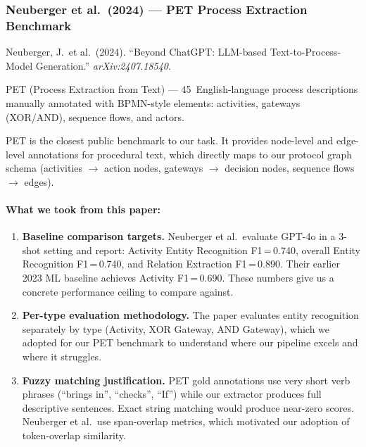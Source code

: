 \documentclass[12pt,a4paper]{article}
\begin{document}
\subsubsection{Neuberger et al.\ (2024) --- PET Process Extraction Benchmark}
\label{sec:neuberger}

\begin{description}[leftmargin=2em]
    \item[Paper:] Neuberger, J.\ et al.\ (2024). ``Beyond ChatGPT: LLM-based Text-to-Process-Model Generation.'' \textit{arXiv:2407.18540}.
    \item[Dataset:] PET (Process Extraction from Text) --- 45~English-language process descriptions manually annotated with BPMN-style elements: activities, gateways (XOR/AND), sequence flows, and actors.
    \item[Relevance:] PET is the closest public benchmark to our task. It provides node-level and edge-level annotations for procedural text, which directly maps to our protocol graph schema (activities $\rightarrow$ action nodes, gateways $\rightarrow$ decision nodes, sequence flows $\rightarrow$ edges).
\end{description}

\paragraph{What we took from this paper:}
\begin{enumerate}[leftmargin=2em]
    \item \textbf{Baseline comparison targets.} Neuberger et al.\ evaluate GPT-4o in a 3-shot setting and report: Activity Entity Recognition F1\,=\,0.740, overall Entity Recognition F1\,=\,0.740, and Relation Extraction F1\,=\,0.890. Their earlier 2023 ML baseline achieves Activity F1\,=\,0.690. These numbers give us a concrete performance ceiling to compare against.
    \item \textbf{Per-type evaluation methodology.} The paper evaluates entity recognition separately by type (Activity, XOR Gateway, AND Gateway), which we adopted for our PET benchmark to understand where our pipeline excels and where it struggles.
    \item \textbf{Fuzzy matching justification.} PET gold annotations use very short verb phrases (``brings in'', ``checks'', ``If'') while our extractor produces full descriptive sentences. Exact string matching would produce near-zero scores. Neuberger et al.\ use span-overlap metrics, which motivated our adoption of token-overlap similarity.
\end{enumerate}
\end{document}
